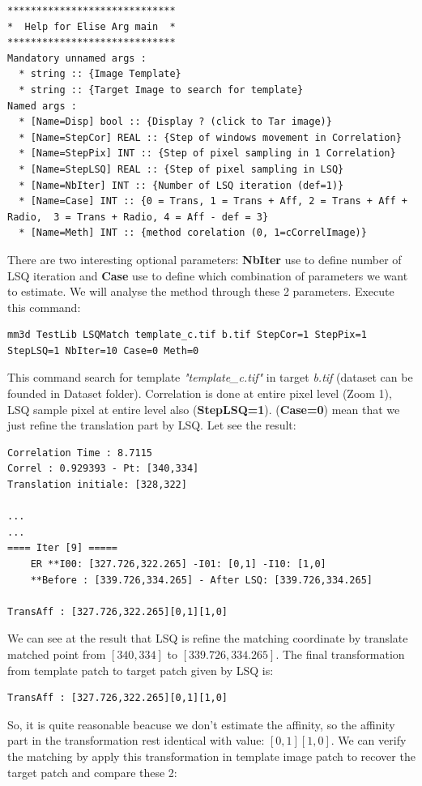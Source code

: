 \documentclass[twoside]{article}
\begin{document}
\begin{verbatim}
*****************************
*  Help for Elise Arg main  *
*****************************
Mandatory unnamed args : 
  * string :: {Image Template}
  * string :: {Target Image to search for template}
Named args : 
  * [Name=Disp] bool :: {Display ? (click to Tar image)}
  * [Name=StepCor] REAL :: {Step of windows movement in Correlation}
  * [Name=StepPix] INT :: {Step of pixel sampling in 1 Correlation}
  * [Name=StepLSQ] REAL :: {Step of pixel sampling in LSQ}
  * [Name=NbIter] INT :: {Number of LSQ iteration (def=1)}
  * [Name=Case] INT :: {0 = Trans, 1 = Trans + Aff, 2 = Trans + Aff + Radio,  3 = Trans + Radio, 4 = Aff - def = 3}
  * [Name=Meth] INT :: {method corelation (0, 1=cCorrelImage)}
\end{verbatim}

There are two interesting optional parameters: \textbf{NbIter} use to define number of LSQ iteration and \textbf{Case} use to define which combination of parameters we want to estimate. We will analyse the method through these 2 parameters. Execute this command: 

\begin{verbatim}
mm3d TestLib LSQMatch template_c.tif b.tif StepCor=1 StepPix=1 StepLSQ=1 NbIter=10 Case=0 Meth=0
\end{verbatim}

This command search for template \textit{"template\_c.tif"} in target \textit{b.tif}
(dataset can be founded in Dataset folder). Correlation is done at entire pixel level (Zoom 1), LSQ sample pixel at entire level also (\textbf{StepLSQ=1}). (\textbf{Case=0}) mean that we just refine the translation part by LSQ. Let see the result:

\begin{verbatim}
Correlation Time : 8.7115
Correl : 0.929393 - Pt: [340,334]
Translation initiale: [328,322]

...
...
==== Iter [9] =====
    ER **I00: [327.726,322.265] -I01: [0,1] -I10: [1,0]
    **Before : [339.726,334.265] - After LSQ: [339.726,334.265]

TransAff : [327.726,322.265][0,1][1,0]
\end{verbatim}

We can see at the result that LSQ is refine the matching coordinate by translate matched point from $[340,334]$ to $[339.726,334.265]$. The final transformation from template patch to target patch given by LSQ is:
\begin{verbatim}
TransAff : [327.726,322.265][0,1][1,0]
\end{verbatim}
So, it is quite reasonable beacuse we don't estimate the affinity, so the affinity part in the transformation rest identical with value: $[0,1][1,0]$. We can verify the matching by apply this transformation in template image patch to recover the target patch and compare these 2:
\end{document}
